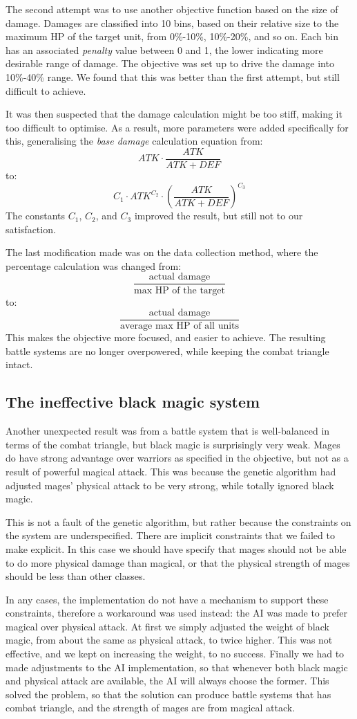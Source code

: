 The second attempt was to use another objective function based on the size of damage. Damages are classified into 10 bins, based on their relative size to the maximum HP of the target unit, from 0\%-10\%, 10\%-20\%, and so on. Each bin has an associated \textit{penalty} value between 0  and 1, the lower indicating more desirable range of damage. The objective was set up to drive the damage into 10\%-40\% range. We found that this was better than the first attempt, but still difficult to achieve.

It was then suspected that the damage calculation might be too stiff, making it too difficult to optimise. As a result, more parameters were added specifically for this, generalising the \textit{base damage} calculation equation from:
\[
ATK \cdot \frac{ATK}{ATK+DEF}
\]
to:
\[
C_1 \cdot ATK^{C_2} \cdot (\frac{ATK}{ATK+DEF})^{C_3}
\]
The constants $C_1$, $C_2$, and $C_3$ improved the result, but still not to our satisfaction.

The last modification made was on the data collection method, where the percentage calculation was changed from:
\[
\frac{\text{actual damage}}{\text{max HP of the target}}\] to: 
\[
\frac{\text{actual damage}}{\text{average max HP of all units}}
\]
This makes the objective more focused, and easier to achieve. The resulting battle systems are no longer overpowered, while keeping the combat triangle intact.

\subsection{The ineffective black magic system}

Another unexpected result was from a battle system that is well-balanced in terms of the combat triangle, but black magic is surprisingly very weak. Mages do have strong advantage over warriors as specified in the objective, but not as a result of powerful magical attack. This was because the genetic algorithm had adjusted mages' physical attack to be very strong, while totally ignored black magic.

This is not a fault of the genetic algorithm, but rather because the constraints on the system are underspecified. There are implicit constraints that we failed to make explicit. In this case we should have specify that mages should not be able to do more physical damage than magical, or that the physical strength of mages should be less than other classes.

In any cases, the implementation do not have a mechanism to support these constraints, therefore a workaround was used instead: the AI was made to prefer magical over physical attack. At first we simply adjusted the weight of black magic, from about the same as physical attack, to twice higher. This was not effective, and we kept on increasing the weight, to no success. Finally we had to made adjustments to the AI implementation, so that whenever both black magic and physical attack are available, the AI will always choose the former. This solved the problem, so that the solution can produce battle systems that has combat triangle, and the strength of mages are from magical attack.

